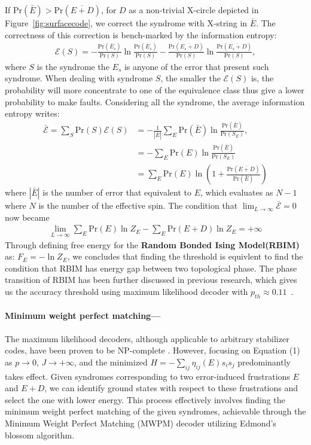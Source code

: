 \documentclass[11pt]{article}
\begin{document}
If $\text{Pr}(\bar{E}) > \text{Pr}(\overline{E + D})$, for $D$ as a non-trivial $\text{X}$-circle depicted in Figure~\ref{fig:surfacecode}, we correct the syndrome with $\text{X-}$string in $\bar E$.  The correctness of this correction is bench-marked by the information entropy:
\begin{align}
    \mathcal{E}(S) = -\frac{\text{Pr}(\bar E_s)}{\text{Pr}(S)} \ln \frac{\text{Pr}(\bar E_s)}{\text{Pr}(S)}  - \frac{\text{Pr}(\overline{E_s + D})}{\text{Pr}(S)} \ln \frac{\text{Pr}(\overline{E_s + D})}{\text{Pr}(S)} ,
\end{align}
where $S$ is the syndrome the $E_s$ is anyone of the error that present such syndrome. When dealing with syndrome $S$, the smaller the $\mathcal{E}(S)$ is, the probability will more concentrate to one of the equivalence class thus give a lower probability to make faults. 
 Considering all the syndrome, the average information entropy writes:
\begin{align}
    \bar{\mathcal{E}} = \sum_S \text{Pr}(S) \mathcal{E}(S) &=-\frac{1}{|\bar E|}\sum_E \text{Pr}(\bar E) \ln \frac{\text{Pr}(\bar E)}{\text{Pr}(S_E)} ,\\
    &=-\sum_E \text{Pr}(E) \ln \frac{\text{Pr}(\bar E)}{\text{Pr}(S_E)} \\
    &= \sum_E \text{Pr}(E) \ln \left(1 + \frac{\text{Pr}(\overline{E+D})}{\text{Pr}(\bar E)}\right)
\end{align}
where $|\bar E|$ is the number of error that equivalent to $E$, which evaluates as $N - 1$ where $N$ is the number of the effective spin. The condition that $\lim_{L \to \infty}\bar{\mathcal{E}} =0$ now became 
\begin{align}
  \lim_{L \to \infty} \sum_E \text{Pr}(E) \ln Z_{E}  - \sum_E \text{Pr}(E+D) \ln Z_{E}  = +\infty 
\end{align}
Through defining free energy for the \textbf{Random Bonded Ising Model(RBIM)} as: $F_E = - \ln Z_E$, we concludes that finding the threshold is equivlent to find the condition that RBIM has energy gap between two topological phase. 
The phase transition of RBIM has been further discussed in previous research, which gives us the accuracy threshold using maximum likelihood decoder with $p_{th} \approx 0.11$~\cite{Dennis_2002}. 

\paragraph{Minimum weight perfect matching---\!\!\!}
The maximum likelihood decoders, although applicable to arbitrary stabilizer codes, have been proven to be NP-complete \cite{PhysRevA.83.052331}. However, focusing on Equation (1) as $ p \to 0 $, $ J \to +\infty $, and the minimized $ H = -\sum_{i j} \eta_{ij}(E) s_i s_j $ predominantly takes effect. Given syndromes corresponding to two error-induced frustrations $ E $ and $ E + D $, we can identify ground states with respect to these frustrations and select the one with lower energy. This process effectively involves finding the minimum weight perfect matching of the given syndromes, achievable through the Minimum Weight Perfect Matching (MWPM) decoder utilizing Edmond’s blossom algorithm.
\end{document}
